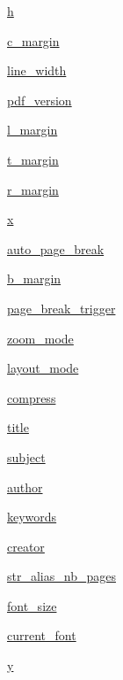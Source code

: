 \begin{DoxyCompactItemize}
\item 
\hyperlink{namespacemmasgis_1_1fpdf_a3713fad79accc929f5ab38759540863c}{h}
\item 
\hyperlink{namespacemmasgis_1_1fpdf_a996ef6c8b39bd3b7b8861fed25e3597f}{c\_\-margin}
\item 
\hyperlink{namespacemmasgis_1_1fpdf_ab176aaf194e5b6b4180874a2785d8d30}{line\_\-width}
\item 
\hyperlink{namespacemmasgis_1_1fpdf_a5d01d258e784da51cf92acfb136432d8}{pdf\_\-version}
\item 
\hyperlink{namespacemmasgis_1_1fpdf_af6d57b225704c7e08c0d40f5c71baee5}{l\_\-margin}
\item 
\hyperlink{namespacemmasgis_1_1fpdf_a295f7b5468bfa2ea3d818feb8f64c082}{t\_\-margin}
\item 
\hyperlink{namespacemmasgis_1_1fpdf_a414e92436bb7b1e4bd5ea8569bedbed3}{r\_\-margin}
\item 
\hyperlink{namespacemmasgis_1_1fpdf_a8b06fc2ad130f0612b9a57fb3cbdf218}{x}
\item 
\hyperlink{namespacemmasgis_1_1fpdf_ad8ec0d17a543cf643cc1d205cbe135c1}{auto\_\-page\_\-break}
\item 
\hyperlink{namespacemmasgis_1_1fpdf_a37fe88dc273a7b51fe0d32f92be1f735}{b\_\-margin}
\item 
\hyperlink{namespacemmasgis_1_1fpdf_ae371836a69279bcf7c2ed15a9557aacf}{page\_\-break\_\-trigger}
\item 
\hyperlink{namespacemmasgis_1_1fpdf_a915fdf15550a9420f58f724f89edae43}{zoom\_\-mode}
\item 
\hyperlink{namespacemmasgis_1_1fpdf_a7b2e01254465a0845368eb2694ccbeb3}{layout\_\-mode}
\item 
\hyperlink{namespacemmasgis_1_1fpdf_a5893c8c8fcc884a37e58ad63ffe2b763}{compress}
\item 
\hyperlink{namespacemmasgis_1_1fpdf_ab8049a1814b7d8e72246bfe099bcdc95}{title}
\item 
\hyperlink{namespacemmasgis_1_1fpdf_abbbbd834a7d34eb7365232df0a29f7a1}{subject}
\item 
\hyperlink{namespacemmasgis_1_1fpdf_a20a5e19dfba72f35fd9f3c6d2a49a6a7}{author}
\item 
\hyperlink{namespacemmasgis_1_1fpdf_a1d81bd6341687c733bf90b9e7b578e69}{keywords}
\item 
\hyperlink{namespacemmasgis_1_1fpdf_a137b3d5db375ef41fadb8e283b2d9cae}{creator}
\item 
\hyperlink{namespacemmasgis_1_1fpdf_a4f9d705cde06dedfaf4b7893e561d789}{str\_\-alias\_\-nb\_\-pages}
\item 
\hyperlink{namespacemmasgis_1_1fpdf_a9ac678ad4b00d09efede2ccb5bb1b77a}{font\_\-size}
\item 
\hyperlink{namespacemmasgis_1_1fpdf_ac15aaa32beb1a3801d1fe30749f199bc}{current\_\-font}
\item 
\hyperlink{namespacemmasgis_1_1fpdf_a8f9be6b6e3f87c5f16a7827d92277210}{y}
\end{DoxyCompactItemize}



